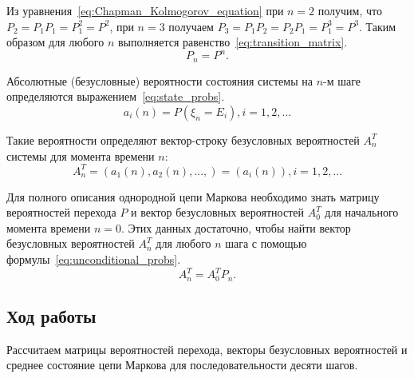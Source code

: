 \pagebreak

Из уравнения~\ref{eq:Chapman_Kolmogorov_equation} при $ n = 2 $ получим, что
$ P_2 = P_1 P_1 = P_1^2 = P^2 $, при $ n = 3 $ получаем
$ P_3 = P_1 P_2 = P_2 P_1 = P_1^3 = P^3 $. Таким образом для любого $ n $
выполняется равенство~\ref{eq:transition_matrix}.
\begin{equation}
\label{eq:transition_matrix}
  P_n = P^n.
\end{equation}

Абсолютные (безусловные) вероятности состояния системы на $n$-м шаге определяются
выражением~\ref{eq:state_probs}.
\begin{equation}
\label{eq:state_probs}
  a_i(n) = P(\xi_n = E_i), i = 1,2,...
\end{equation}

Такие вероятности определяют вектор-строку безусловных вероятностей $ A_n^T $
системы для момента времени $ n $:
\begin{equation*}
  A_n^T = (a_1(n), a_2(n), ...,) = (a_i(n)), i = 1,2,...
\end{equation*}

Для полного описания однородной цепи Маркова необходимо знать матрицу
вероятностей перехода $P$ и вектор безусловных вероятностей $A_0^T$ для
начального момента времени $ n = 0 $. Этих данных достаточно, чтобы найти
вектор безусловных вероятностей $A_n^T$ для любого $n$ шага с помощью
формулы~\ref{eq:unconditional_probs}.
\begin{equation}
\label{eq:unconditional_probs}
  A_n^T = A_0^T P_n .
\end{equation}

\subsection{Ход работы}

Рассчитаем матрицы вероятностей перехода, векторы безусловных вероятностей
и среднее состояние цепи Маркова для последовательности десяти шагов.


